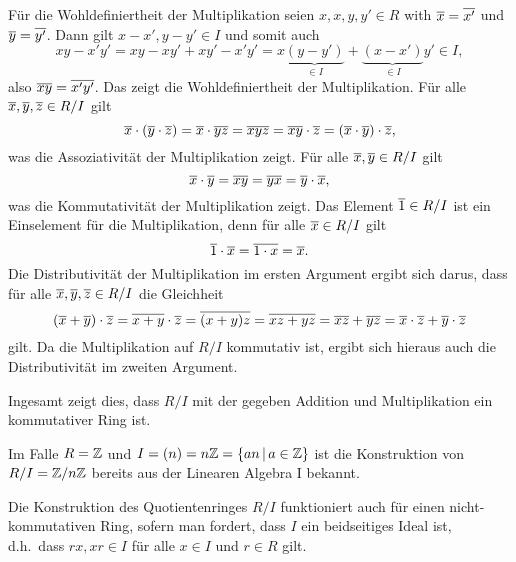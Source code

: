 Für die Wohldefiniertheit der Multiplikation seien $x, x, y, y' \in R$ with $\overline{x} = \overline{x'}$ und $\overline{y} = \overline{y'}$.
Dann gilt $x - x', y - y' \in I$ und somit auch
\[
      xy - x'y'
  =   xy - xy' + xy' - x'y'
  =   x \underbrace{(y-y')}_{\in I} + \underbrace{(x-x')}_{\in I} y'
  \in I,
\]
also $\overline{xy} = \overline{x'y'}$.
Das zeigt die Wohldefiniertheit der Multiplikation.
Für alle $\overline{x}, \overline{y}, \overline{z} \in R/I$ gilt
\[
    \overline{x} \cdot (\overline{y} \cdot \overline{z})
  = \overline{x} \cdot \overline{yz}
  = \overline{xyz}
  = \overline{xy} \cdot \overline{z}
  = (\overline{x} \cdot \overline{y}) \cdot \overline{z},
\]
was die Assoziativität der Multiplikation zeigt.
Für alle $\overline{x}, \overline{y} \in R/I$ gilt
\[
    \overline{x} \cdot \overline{y}
  = \overline{xy}
  = \overline{yx}
  = \overline{y} \cdot \overline{x},
\]
was die Kommutativität der Multiplikation zeigt.
Das Element $\overline{1} \in R/I$ ist ein Einselement für die Multiplikation, denn für alle $\overline{x} \in R/I$ gilt
\[
    \overline{1} \cdot \overline{x}
  = \overline{1 \cdot x}
  = \overline{x}.
\]
Die Distributivität der Multiplikation im ersten Argument ergibt sich darus, dass für alle $\overline{x}, \overline{y}, \overline{z} \in R/I$ die Gleichheit
\[
  (\overline{x} + \overline{y}) \cdot \overline{z}
  = \overline{x + y} \cdot \overline{z}
  = \overline{(x + y) z}
  = \overline{xz + yz}
  = \overline{xz} + \overline{yz}
  = \overline{x} \cdot \overline{z} + \overline{y} \cdot \overline{z}
\]
gilt.
Da die Multiplikation auf $R/I$ kommutativ ist, ergibt sich hieraus auch die Distributivität im zweiten Argument.

Ingesamt zeigt dies, dass $R/I$ mit der gegeben Addition und Multiplikation ein kommutativer Ring ist.

\begin{remark}
  Im Falle $R = \mathbb{Z}$ und $I = (n) = n \mathbb{Z} = \{ an \,|\, a \in \mathbb{Z} \}$ ist die Konstruktion von $R/I = \mathbb{Z}/n\mathbb{Z}$ bereits aus der Linearen Algebra I bekannt.
\end{remark}

\begin{remark}
  Die Konstruktion des Quotientenringes $R/I$ funktioniert auch für einen nicht-kommutativen Ring, sofern man fordert, dass $I$ ein beidseitiges Ideal ist, d.h.\ dass $r x , x r \in I$ für alle $x \in I$ und $r \in R$ gilt.
\end{remark}





\subsection{}

